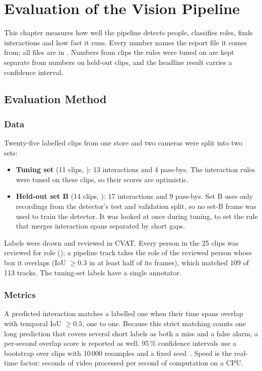 \chapter{Evaluation of the Vision Pipeline}
\label{ch:cveval}

This chapter measures how well the pipeline detects people, classifies roles, finds interactions and how fast it runs. Every number names the report file it comes from; all files are in . Numbers from clips the rules were tuned on are kept separate from numbers on held-out clips, and the headline result carries a confidence interval.

\section{Evaluation Method}
\subsection{Data}
Twenty-five labelled clips from one store and two cameras were split into two sets:
\begin{itemize}
\item \textbf{Tuning set} (11 clips, ): 13 interactions and 4 pass-bys. The interaction rules were tuned on these clips, so their scores are optimistic.
\item \textbf{Held-out set B} (14 clips, ): 17 interactions and 9 pass-bys. Set B uses only recordings from the detector's test and validation split, so no set-B frame was used to train the detector. It was looked at once during tuning, to set the rule that merges interaction spans separated by short gaps.
\end{itemize}
Labels were drawn and reviewed in CVAT. Every person in the 25 clips was reviewed for role (); a pipeline track takes the role of the reviewed person whose box it overlaps (IoU $\geq 0.3$ in at least half of its frames), which matched 109 of 113 tracks. The tuning-set labels have a single annotator.

\subsection{Metrics}
A predicted interaction matches a labelled one when their time spans overlap with temporal IoU $\geq 0.5$, one to one. Because this strict matching counts one long prediction that covers several short labels as both a miss and a false alarm, a per-second overlap score is reported as well. 95\,\% confidence intervals use a bootstrap over clips with 10\,000 resamples and a fixed seed~\cite{efron1979bootstrap}. Speed is the real-time factor: seconds of video processed per second of computation on a CPU.

